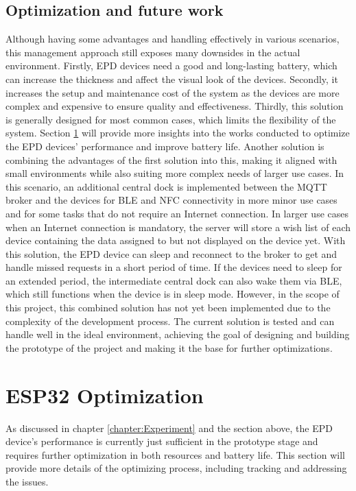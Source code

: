 \documentclass[../Main.tex]{subfiles}
\begin{document}
\subsection{Optimization and future work}
\label{opt}
Although having some advantages and handling effectively in various scenarios, this management approach still exposes many downsides in the actual environment. Firstly, \gls{EPD} devices need a good and long-lasting battery, which can increase the thickness and affect the visual look of the devices. Secondly, it increases the setup and maintenance cost of the system as the devices are more complex and expensive to ensure quality and effectiveness. Thirdly, this solution is generally designed for most common cases, which limits the flexibility of the system. Section \ref{section:optimization} will provide more insights into the works conducted to optimize the \gls{EPD} devices' performance and improve battery life. Another solution is combining the advantages of the first solution into this, making it aligned with small environments while also suiting more complex needs of larger use cases. In this scenario, an additional central dock is implemented between the MQTT broker and the devices for BLE and NFC connectivity in more minor use cases and for some tasks that do not require an Internet connection. In larger use cases when an Internet connection is mandatory, the server will store a wish list of each device containing the data assigned to but not displayed on the device yet. With this solution, the \gls{EPD} device can sleep and reconnect to the broker to get and handle missed requests in a short period of time. If the devices need to sleep for an extended period, the intermediate central dock can also wake them via BLE, which still functions when the device is in sleep mode. However, in the scope of this project, this combined solution has not yet been implemented due to the complexity of the development process. The current solution is tested and can handle well in the ideal environment, achieving the goal of designing and building the prototype of the project and making it the base for further optimizations.

\section{ESP32 Optimization}
\label{section:optimization}
As discussed in chapter \ref{chapter:Experiment} and the section above, the \gls{EPD} device's performance is currently just sufficient in the prototype stage and requires further optimization in both resources and battery life. This section will provide more details of the optimizing process, including tracking and addressing the issues.
\end{document}
